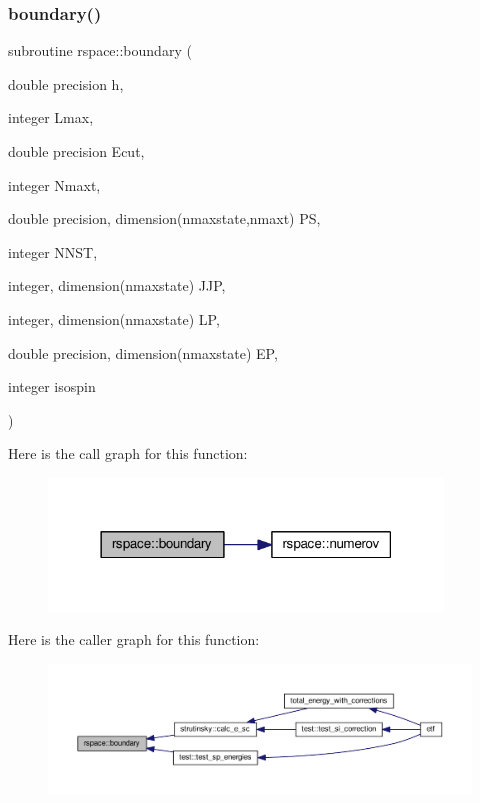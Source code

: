 \subsubsection{\texorpdfstring{boundary()}{boundary()}}
{\footnotesize\ttfamily subroutine rspace\+::boundary (\begin{DoxyParamCaption}\item[{double precision}]{h,  }\item[{integer}]{Lmax,  }\item[{double precision}]{Ecut,  }\item[{integer}]{Nmaxt,  }\item[{double precision, dimension(nmaxstate,nmaxt)}]{PS,  }\item[{integer}]{N\+N\+ST,  }\item[{integer, dimension(nmaxstate)}]{J\+JP,  }\item[{integer, dimension(nmaxstate)}]{LP,  }\item[{double precision, dimension(nmaxstate)}]{EP,  }\item[{integer}]{isospin }\end{DoxyParamCaption})}

Here is the call graph for this function\+:
\nopagebreak
\begin{figure}[H]
\begin{center}
\leavevmode
\includegraphics[width=297pt]{namespacerspace_af32fb6df1b49e330db5a70e2b05faa5b_cgraph}
\end{center}
\end{figure}
Here is the caller graph for this function\+:
\nopagebreak
\begin{figure}[H]
\begin{center}
\leavevmode
\includegraphics[width=350pt]{namespacerspace_af32fb6df1b49e330db5a70e2b05faa5b_icgraph}
\end{center}
\end{figure}
\mbox{\label{namespacerspace_a95f8e6b75776b923eb4ab9cc71a3be33}} 
